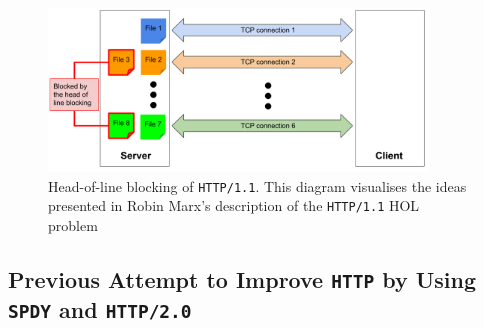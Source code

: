 \documentclass[12pt,a4paper,twoside,openright]{report}
\begin{document}
    \begin{figure}[H]
    \centering
    \includegraphics[width=0.9\textwidth]{figs/Head_of_line_blocking_of_HTTP1_1.png}
    \caption[Head-of-line blocking of \texttt{HTTP/1.1}]{Head-of-line blocking of \texttt{HTTP/1.1}. This diagram visualises the ideas presented in Robin Marx's description of the \texttt{HTTP/1.1} HOL problem~\cite{head-of-line-blocking-in-quic-and-http-3-the-details}}
    \label{fig:Head_of_line_blocking_of_HTTP1_1}
    \end{figure}





\subsection{Previous Attempt to Improve \texttt{HTTP} by Using \texttt{SPDY} and \texttt{HTTP/2.0}} \label{Previous_attempt_to_improve_http_by_using_SPDY_and_HTTP2}
\end{document}
